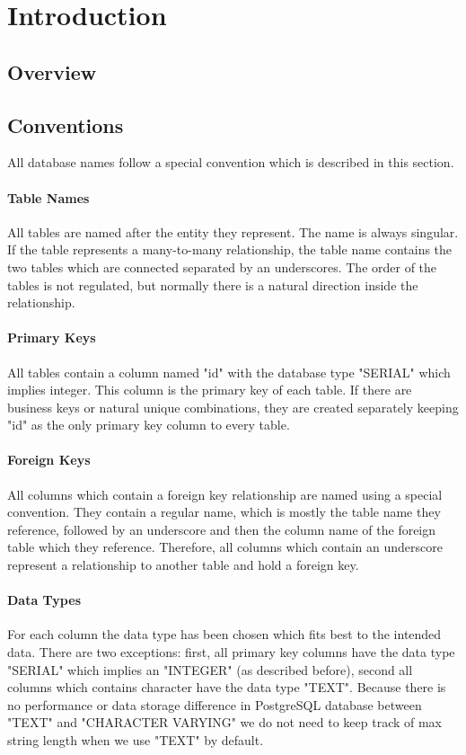\section{Introduction}
\label{sec:intro}


\subsection{Overview}





\subsection{Conventions}

All database names follow a special convention which is described in this section.


\paragraph{Table Names}
All tables are named after the entity they represent. The name is always singular. If the table represents a many-to-many relationship, the table name contains the two tables which are connected separated by an underscores. The order of the tables is not regulated, but normally there is a natural direction inside the relationship.

\paragraph{Primary Keys}
All tables contain a column named "id" with the database type "SERIAL" which implies integer. This column is the primary key of each table. If there are business keys or natural unique combinations, they are created separately keeping "id" as the only primary key column to every table.

\paragraph{Foreign Keys}
All columns which contain a foreign key relationship are named using a special convention. They contain a regular name, which is mostly the table name they reference, followed by an underscore and then the column name of the foreign table which they reference. Therefore, all columns which contain an underscore represent a relationship to another table and hold a foreign key.

\paragraph{Data Types}
For each column the data type has been chosen which fits best to the intended data. There are two exceptions: first, all primary key columns have the data type "SERIAL" which implies an "INTEGER" (as described before), second all columns which contains character have the data type "TEXT". Because there is no performance or data storage difference in PostgreSQL database between "TEXT" and "CHARACTER VARYING" we do not need to keep track of max string length when we use "TEXT" by default.